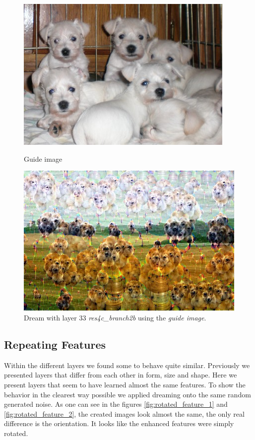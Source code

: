 \begin{figure}[H]
	\centering
	\includegraphics[width=1\linewidth]{img/guide.jpg}
	\caption{Guide image\cite{imgpuppies}}
	\label{fig:guide}
	\endminipage\hfill
	\centering
	\includegraphics[width=1\linewidth]{img/guide_dream.jpg}
	\caption{Dream with layer 33 \emph{res4c\_branch2b} using the \emph{guide image}.}
	\label{fig:guide_dream}
	\endminipage\hfill
\end{figure}



\subsection{Repeating Features}
\label{sec:repeating-features}

Within the different layers we found some to behave quite similar.
Previously we presented layers that differ from each other in form, size and shape.
Here we present layers that seem to have learned almost the same features.
To show the behavior in the clearest way possible we applied dreaming onto the same random generated noise.
As one can see in the figures \ref{fig:rotated_feature_1} and \ref{fig:rotated_feature_2}, the created images look almost the same, the only real difference is the orientation.
It looks like the enhanced features were simply rotated.

